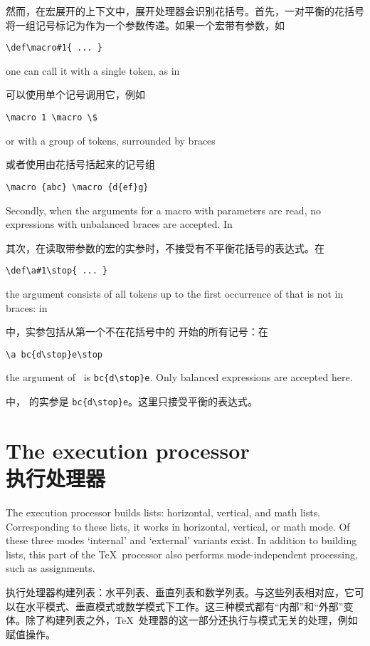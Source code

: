 然而，在宏展开的上下文中，展开处理器会识别花括号。首先，一对平衡的花括号将一组记号标记为作为一个参数传递。如果一个宏带有参数，如\begin{verbatim}
\def\macro#1{ ... }
\end{verbatim}
one can call it with a single token, as in

可以使用单个记号调用它，例如
\begin{verbatim}
\macro 1 \macro \$
\end{verbatim}
or with a group of tokens, surrounded by braces

或者使用由花括号括起来的记号组
\begin{verbatim}
\macro {abc} \macro {d{ef}g}
\end{verbatim}



Secondly, when the arguments for a macro with
parameters are read, no expressions with unbalanced braces
are accepted. In 

其次，在读取带参数的宏的实参时，不接受有不平衡花括号的表达式。在
\begin{verbatim}
\def\a#1\stop{ ... }
\end{verbatim}
the argument consists of all
tokens up to the first occurrence of 
that is not in braces: in

中，实参包括从第一个不在花括号中的  开始的所有记号：在
\begin{verbatim}
\a bc{d\stop}e\stop
\end{verbatim}
the argument of~ is \verb>bc{d\stop}e>.
Only balanced expressions
are accepted here.

中， 的实参是 \verb>bc{d\stop}e>。这里只接受平衡的表达式。




\section{The execution processor\\执行处理器}

The execution processor builds lists: horizontal, vertical,
and math lists. Corresponding to these lists, it works
in horizontal, vertical, or math mode. Of these three modes
`internal' and `external' variants exist.
In addition to building lists, this part of the \TeX\ processor
also performs mode-independent processing, such as
assignments.

执行处理器构建列表：水平列表、垂直列表和数学列表。与这些列表相对应，它可以在水平模式、垂直模式或数学模式下工作。这三种模式都有“内部”和“外部”变体。除了构建列表之外，\TeX\ 处理器的这一部分还执行与模式无关的处理，例如赋值操作。

